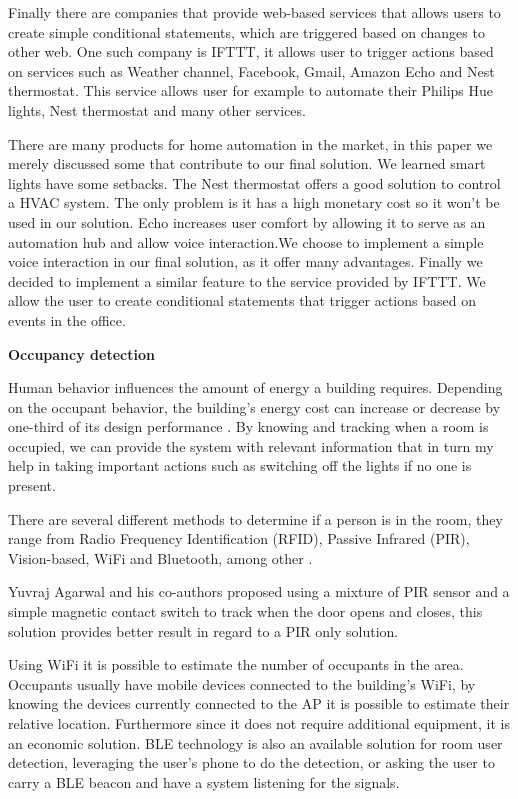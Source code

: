 \documentclass[conference]{IEEEtran}
\begin{document}
Finally there are companies that provide web-based services that allows users to create simple conditional statements, which are triggered based on changes to other web. One such company is IFTTT, it allows user to trigger actions based on services such as Weather channel, Facebook, Gmail, Amazon Echo and Nest thermostat. This service allows user for example to automate their Philips Hue lights, Nest thermostat and many other services. 


There are many products for home automation in the market, in this paper we merely discussed some that contribute to our final solution. We learned smart lights have some setbacks. The Nest thermostat offers a good solution to control a \ac{HVAC} system. The only problem is it has a high monetary cost so it won't be used in our solution. Echo increases user comfort by allowing it to serve as an automation hub and allow voice interaction.We choose to implement a simple voice interaction in our final solution, as it offer many advantages. Finally we decided to implement a similar feature to the service provided by IFTTT. We allow the user to create conditional statements that trigger actions based on events in the office.


\textbf{Occupancy detection}


Human behavior influences the amount of energy a building requires. Depending on the occupant behavior, the building's energy cost can increase or decrease by one-third of its design performance \cite{ocupancy2}. 
By knowing and tracking when a room is occupied, we can provide the system with relevant information that in turn my help in taking important actions such as switching off the lights if no one is present. 

There are several different methods to determine if a person is in the room, they range from Radio Frequency Identification (RFID), Passive Infrared (PIR), Vision-based, \ac{WiFi} and Bluetooth, among other \cite{ocupancy3}.

Yuvraj Agarwal and his co-authors proposed using a mixture of PIR sensor and a simple magnetic contact switch to track when the door opens and closes, this solution provides better result in regard to a PIR only solution\cite{ocupancy1}.

Using \ac{WiFi} it is possible to estimate the number of occupants in the area. Occupants usually have mobile devices connected to the building's \ac{WiFi}, by knowing the devices currently connected to the AP it is possible to estimate their relative location. Furthermore since it does not require additional equipment, it is an economic solution.
\ac{BLE} technology is also an available solution for room user detection, leveraging the user's phone to do the detection, or asking the user to carry a \ac{BLE} beacon and have a system listening for the signals.  
\end{document}
